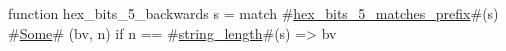 function hex_bits_5_backwards s =
  match #\hyperref[sailRISCVzhexzybitszy5zymatcheszyprefix]{hex\_bits\_5\_matches\_prefix}#(s) {
      #\hyperref[sailRISCVzSome]{Some}# (bv, n) if n == #\hyperref[sailRISCVzstringzylength]{string\_length}#(s) => bv
  }
